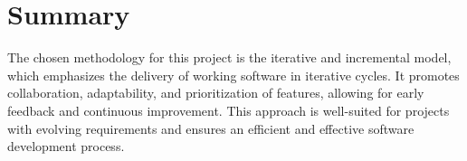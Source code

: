 \section{Summary}
The chosen methodology for this project is the iterative and incremental model, which emphasizes the delivery of working software in iterative cycles. It promotes collaboration, adaptability, and prioritization of features, allowing for early feedback and continuous improvement. This approach is well-suited for projects with evolving requirements and ensures an efficient and effective software development process.